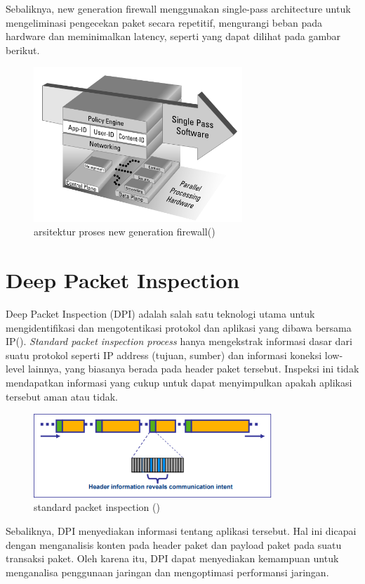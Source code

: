 Sebaliknya, new generation firewall menggunakan single-pass architecture untuk mengeliminasi pengecekan paket secara repetitif, mengurangi beban pada hardware dan meminimalkan latency, seperti yang dapat dilihat pada gambar berikut.
\begin{figure}[H]
	\centering
	\includegraphics[width=0.7\textwidth]{resources/architecture_NGFW.png}
	\caption{arsitektur proses new generation firewall(\cite{miller2011next})}
	\label{fig:architecture_NGFW}
\end{figure}

\section{Deep Packet Inspection}
Deep Packet Inspection (DPI) adalah salah satu teknologi utama untuk mengidentifikasi dan mengotentikasi protokol dan aplikasi yang dibawa bersama IP(\cite{allot2007digging}). \textit{Standard packet inspection process} hanya mengekstrak informasi dasar dari suatu protokol seperti IP address (tujuan, sumber) dan informasi koneksi low-level lainnya, yang biasanya berada pada header paket tersebut. Inspeksi ini tidak mendapatkan informasi yang cukup untuk dapat menyimpulkan apakah aplikasi tersebut aman atau tidak. 
\begin{figure}[H]
	\centering
	\includegraphics[width=0.8\textwidth]{resources/standard_inspection.png}
	\caption{standard packet inspection (\cite{allot2007digging})}
	\label{fig:standard_inspection}
\end{figure}
Sebaliknya, DPI menyediakan informasi tentang aplikasi tersebut. Hal ini dicapai dengan menganalisis konten pada header paket dan payload paket pada suatu transaksi paket. Oleh karena itu, DPI dapat menyediakan kemampuan untuk menganalisa penggunaan jaringan dan mengoptimasi performansi jaringan. 


